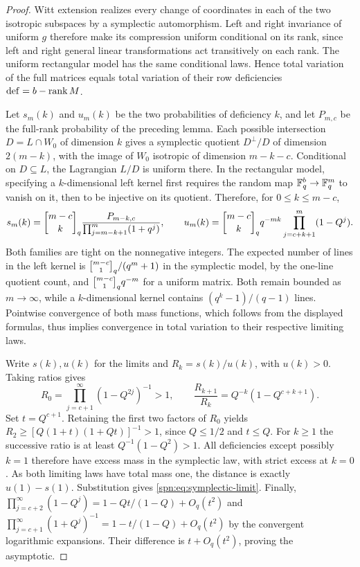 \begin{proof}
Witt extension realizes every change of coordinates in each of the two
isotropic subspaces by a symplectic automorphism. Left and right invariance
of uniform $g$ therefore make its compression uniform conditional on its
rank, since left and right general linear transformations act transitively
on each rank. The uniform rectangular model has the same conditional laws.
Hence total variation of the full matrices equals total variation of their
row deficiencies $\mathrm{def}=b-\operatorname{rank} M$.

Let $s_m(k)$ and $u_m(k)$ be the two probabilities of deficiency $k$, and let
$P_{m,c}$ be the full-rank probability of the preceding lemma. Each
possible intersection $D=L\cap W_0$ of dimension $k$ gives a symplectic
quotient $D^\perp/D$ of dimension $2(m-k)$, with the image of $W_0$ isotropic
of dimension $m-k-c$. Conditional on $D\subseteq L$, the Lagrangian $L/D$ is
uniform there. In the rectangular model, specifying a $k$-dimensional left
kernel first requires the random map $\mathbb{F}_q^b\to\mathbb{F}_q^m$ to vanish on it, then
to be injective on its quotient. Therefore, for $0\le k\le m-c$,
\[
 s_m(k)=\spnqbin{m-c}{k}{q}\frac{P_{m-k,c}}{\prod_{j=m-k+1}^{m}(1+q^j)},
 \qquad
 u_m(k)=\spnqbin{m-c}{k}{q}q^{-mk}\prod_{j=c+k+1}^{m}(1-Q^j).
\]
Both families are tight on the nonnegative integers. The expected number of
lines in the left kernel is $\spnqbin{m-c}{1}{q}/(q^m+1)$ in the symplectic
model, by the one-line quotient count, and $\spnqbin{m-c}{1}{q}q^{-m}$ for a
uniform matrix. Both remain bounded as $m\to\infty$, while a $k$-dimensional
kernel contains $(q^k-1)/(q-1)$ lines. Pointwise convergence of both mass
functions, which follows from the displayed formulas, thus implies
convergence in total variation to their respective limiting laws.

Write $s(k),u(k)$ for the limits and $R_k=s(k)/u(k)$, with $u(k)>0$. Taking
ratios gives
\[
 R_0=\prod_{j=c+1}^{\infty}(1-Q^{2j})^{-1}>1,\qquad
 \frac{R_{k+1}}{R_k}=Q^{-k}(1-Q^{c+k+1}).
\]
Set $t=Q^{c+1}$. Retaining the first two factors of $R_0$ yields
$R_2\ge[Q(1+t)(1+Qt)]^{-1}>1$, since $Q\le1/2$ and $t\le Q$. For $k\ge1$ the
successive ratio is at least $Q^{-1}(1-Q^2)>1$. All deficiencies except
possibly $k=1$ therefore have excess mass in the symplectic law, with strict
excess at $k=0$. As both limiting laws have total mass one, the distance is
exactly $u(1)-s(1)$. Substitution gives \eqref{spn:eq:symplectic-limit}.
Finally, $\prod_{j=c+2}^\infty(1-Q^j)=1-Qt/(1-Q)+O_q(t^2)$ and
$\prod_{j=c+1}^\infty(1+Q^j)^{-1}=1-t/(1-Q)+O_q(t^2)$ by the convergent
logarithmic expansions. Their difference is $t+O_q(t^2)$, proving the
asymptotic.
\end{proof}


